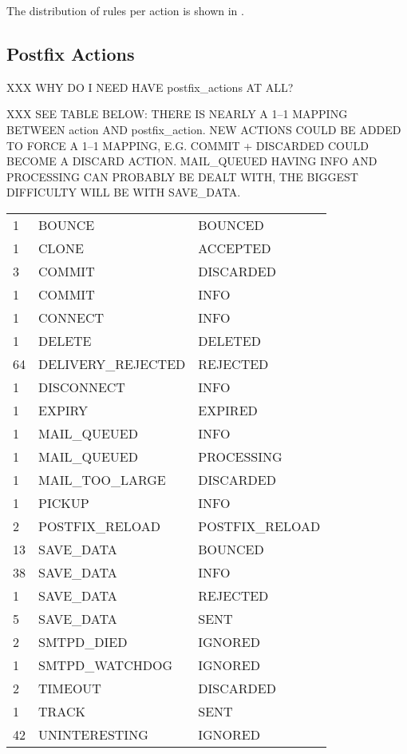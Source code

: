 The distribution of rules per action is shown in .


\subsection{Postfix Actions}

\label{list of postfix actions in implementation}

XXX WHY DO I NEED HAVE postfix\_actions AT ALL\@?

XXX SEE TABLE BELOW\@: THERE IS NEARLY A 1--1 MAPPING BETWEEN action AND
postfix\_action.  NEW ACTIONS COULD BE ADDED TO FORCE A 1--1 MAPPING, E.G.
COMMIT + DISCARDED COULD BECOME A DISCARD ACTION\@.  MAIL\_QUEUED HAVING
INFO AND PROCESSING CAN PROBABLY BE DEALT WITH, THE BIGGEST DIFFICULTY WILL
BE WITH SAVE\_DATA\@.

\begin{tabular}{lll}

1 & BOUNCE & BOUNCED \\
1 & CLONE & ACCEPTED \\
3 & COMMIT & DISCARDED \\
1 & COMMIT & INFO \\
1 & CONNECT & INFO \\
1 & DELETE & DELETED \\
64 & DELIVERY\_REJECTED & REJECTED \\
1 & DISCONNECT & INFO \\
1 & EXPIRY & EXPIRED \\
1 & MAIL\_QUEUED & INFO \\
1 & MAIL\_QUEUED & PROCESSING \\
1 & MAIL\_TOO\_LARGE & DISCARDED \\
1 & PICKUP & INFO \\
2 & POSTFIX\_RELOAD & POSTFIX\_RELOAD \\
13 & SAVE\_DATA & BOUNCED \\
38 & SAVE\_DATA & INFO \\
1 & SAVE\_DATA & REJECTED \\
5 & SAVE\_DATA & SENT \\
2 & SMTPD\_DIED & IGNORED \\
1 & SMTPD\_WATCHDOG & IGNORED \\
2 & TIMEOUT & DISCARDED \\
1 & TRACK & SENT \\
42 & UNINTERESTING & IGNORED \\

\end{tabular}

